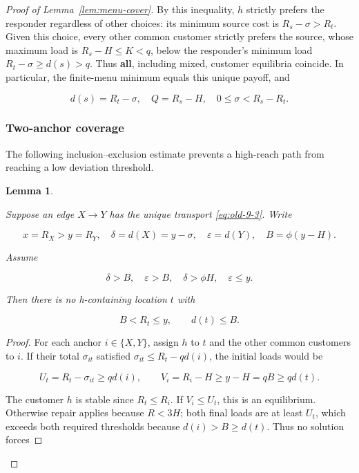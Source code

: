 \documentclass[11pt]{amsart}
\numberwithin{equation}{section}
\newtheorem{lemma}[theorem]{Lemma}
\theoremstyle{definition}
\begin{document}
\begin{proof}[Proof of Lemma~\ref{lem:menu-cover}]
By this inequality, \(h\) strictly prefers the responder regardless of other choices: its minimum source cost is \(R_s-\sigma>R_t\). Given this choice, every other common customer strictly prefers the source, whose maximum load is \(R_s-H\le K<q\), below the responder's minimum load \(R_t-\sigma\ge d(s)>q\). Thus \textbf{all}, including mixed, customer equilibria coincide. In particular, the finite-menu minimum equals this unique payoff, and

\begin{equation}
d(s)=R_t-\sigma,\quad Q=R_s-H,\quad 0\le\sigma<R_s-R_t. \label{eq:old-9-3}
\end{equation}


\subsubsection{Two-anchor coverage}\label{general-two-anchor-covering-lemma}
The following inclusion--exclusion estimate prevents a high-reach path from reaching a low deviation threshold.
\begin{lemma}\label{lem:two-anchor}

Suppose an edge \(X\to Y\) has the unique transport \eqref{eq:old-9-3}. Write

\[
x=R_X>y=R_Y,\quad \delta=d(X)=y-\sigma,\quad \varepsilon=d(Y),
\quad B=\phi(y-H).
\]

Assume

\begin{equation}
\delta>B,\quad \varepsilon>B,\quad \delta>\phi H,\quad \varepsilon\le y. \label{eq:old-9-4}
\end{equation}

Then there is no h-containing location \(t\) with

\begin{equation}
B<R_t\le y,\qquad d(t)\le B. \label{eq:old-9-5}
\end{equation}

\end{lemma}
\begin{proof}
For each anchor \(i\in\{X,Y\}\), assign \(h\) to \(t\) and the other common customers to \(i\). If their total \(\sigma_{it}\) satisfied \(\sigma_{it}\le R_t-qd(i)\), the initial loads would be

\[
U_t=R_t-\sigma_{it}\ge qd(i),\qquad V_i=R_i-H\ge y-H=qB\ge qd(t).
\]

The customer \(h\) is stable since \(R_t\le R_i\). If \(V_i\le U_t\), this is an equilibrium. Otherwise repair applies because \(R<3H\); both final loads are at least \(U_t\), which exceeds both required thresholds because \(d(i)>B\ge d(t)\). Thus no solution forces


\end{proof}
\end{proof}
\end{document}

